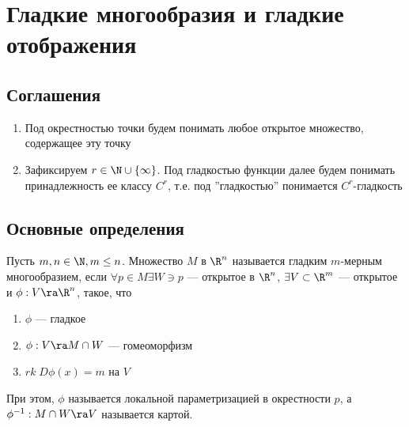 
\section{Гладкие многообразия и гладкие отображения}

\subsection{Соглашения}
\begin{enumerate}
    \item Под окрестностью точки будем понимать любое открытое множество, содержащее эту точку
    \item Зафиксируем \(r \in \N \cup \{\infty\}\). Под гладкостью функции далее будем понимать принадлежность ее классу \(C^r\), т.е. под ''гладкостью'' понимается \(C^r\)-гладкость
\end{enumerate}

\subsection{Основные определения}
\begin{definition}
    Пусть \(m, n \in \N, m \le n\). Множество \(M\) в \(\R^n\) называется гладким \(m\)-мерным многообразием, если \(\forall p \in M \exists W \ni p\) --- открытое в \(\R^n\), \(\exists V \subset \R^m\) --- открытое и \(\phi: V \ra \R^n\), такое, что
    \begin{enumerate}
        \item \(\phi\) --- гладкое
        \item \(\phi: V \ra M \cap W\) --- гомеоморфизм
        \item \(rk\;D\phi(x) = m\) на \(V\)
    \end{enumerate}
    При этом, \(\phi\) называется локальной параметризацией в окрестности \(p\), а \(\phi^{-1}: M \cap W \ra V\) называется картой.
\end{definition}

